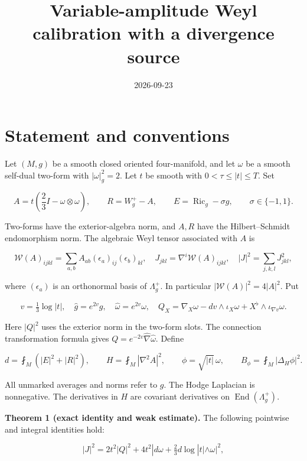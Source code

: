 \documentclass[
]{article}
\title{Variable-amplitude Weyl calibration with a divergence source}
\author{}
\date{2026-09-23}
\begin{document}
\maketitle

\hypertarget{statement-and-conventions}{%
\section{Statement and conventions}\label{statement-and-conventions}}

Let \((M,g)\) be a smooth closed oriented four-manifold, and let
\(\omega\) be a smooth self-dual two-form with \(|\omega|_g^2=2\). Let
\(t\) be smooth with \(0<\tau\le |t|\le T\). Set

\[
 A=t\left(\frac23 I-\omega\otimes\omega\right),\qquad
 R=W_g^+-A,\qquad E=\operatorname{Ric}_g-\sigma g,
 \qquad \sigma\in\{-1,1\}.
 \tag{1}
\]

Two-forms have the exterior-algebra norm, and \(A,R\) have the
Hilbert--Schmidt endomorphism norm. The algebraic Weyl tensor associated
with \(A\) is

\[
 \mathcal W(A)_{ijkl}=\sum_{a,b}A_{ab}(\epsilon_a)_{ij}(\epsilon_b)_{kl},
 \quad J_{jkl}=\nabla^i\mathcal W(A)_{ijkl},
 \quad |J|^2=\sum_{j,k,l}J_{jkl}^2,
 \tag{2}
\]

where \((\epsilon_a)\) is an orthonormal basis of \(\Lambda_g^+\). In
particular \(|\mathcal W(A)|^2=4|A|^2\). Put

\[
 v=\tfrac13\log|t|,\quad \widehat g=e^{2v}g,
 \quad \widehat\omega=e^{2v}\omega,\quad
 Q_X=\nabla_X\omega-dv\wedge\iota_X\omega
                   +X^\flat\wedge\iota_{\nabla v}\omega.
 \tag{3}
\]

Here \(|Q|^2\) uses the exterior norm in the two-form slots. The
connection transformation formula gives
\(Q=e^{-2v}\widehat\nabla\widehat\omega\). Define

\[
 d=\fint_M(|E|^2+|R|^2),\qquad
 H=\fint_M|\nabla^2 A|^2,\qquad
 \phi=\sqrt{|t|}\,\omega,\qquad
 B_\phi=\fint_M|\Delta_H\phi|^2.
 \tag{4}
\]

All unmarked averages and norms refer to \(g\). The Hodge Laplacian is
nonnegative. The derivatives in \(H\) are covariant derivatives on
\(\operatorname{End}(\Lambda_g^+)\).

\textbf{Theorem 1 (exact identity and weak estimate).} The following
pointwise and integral identities hold:

\[
 \boxed{|J|^2=2t^2|Q|^2
       +4t^2|d\omega+\tfrac23d\log|t|\wedge\omega|^2,}
 \tag{5}
\]
\end{document}
